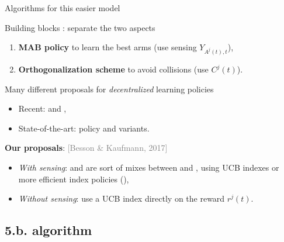 \documentclass[12pt,english,ignorenonframetext,]{beamer}
\providecommand{\tightlist}{%
  \setlength{\itemsep}{0pt}\setlength{\parskip}{0pt}}
\begin{document}
\begin{frame}{Algorithms for this easier model}

\begin{block}{Building blocks : separate the two aspects}

\begin{enumerate}
\def\labelenumi{\arabic{enumi}.}
\tightlist
\item
  \textbf{MAB policy} to learn the best arms (use sensing
  \(Y_{A^j(t),t}\)),
\item
  \textbf{Orthogonalization scheme} to avoid collisions (use
  \(C^j(t)\)).
\end{enumerate}

\pause

\end{block}

\begin{block}{Many different proposals for \emph{decentralized} learning
policies}

\begin{itemize}
\tightlist
\item
  Recent: \MEGA{} and \MusicalChair{},
\item
  State-of-the-art: \rhoRand{} policy and variants.
  \citationright{[Anandkumar et al, 2011]}
\end{itemize}

\pause

\end{block}

\begin{block}{\textbf{Our proposals}:
\hfill{}\textcolor{gray}{[Besson \& Kaufmann, 2017]}}

\begin{itemize}
\tightlist
\item
  \emph{With sensing}: \RandTopM{} and \MCTopM{} are sort of mixes
  between \rhoRand{} and \MusicalChair, using UCB indexes or more
  efficient index policies (\klUCB),
\item
  \emph{Without sensing}: \Selfish{} use a UCB index directly on the
  reward \(r^j(t)\).
\end{itemize}

\end{block}

\end{frame}



\subsection{\hfill{}5.b. \RandTopM{} algorithm\hfill{}}
\end{document}
